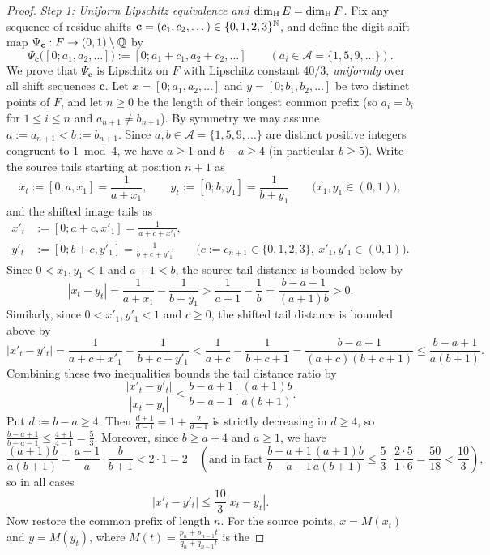 \begin{proof}
\emph{Step 1: Uniform Lipschitz equivalence and $\dim_{\mathrm{H}} E=\dim_{\mathrm{H}} F$.}
Fix any sequence of residue shifts $\mathbf c=(c_1,c_2,\dots)\in\{0,1,2,3\}^{\mathbb{N}}$,
and define the digit-shift map $\Psi_{\mathbf c}:F\to(0,1)\setminus\mathbb{Q}$ by
\[
\Psi_{\mathbf c}\bigl([0;a_1,a_2,\dots]\bigr):=[0;a_1+c_1,a_2+c_2,\dots]
\qquad(a_i\in\mathcal A=\{1,5,9,\dots\}).
\]
We prove that $\Psi_{\mathbf c}$ is Lipschitz on $F$ with Lipschitz constant
$40/3$, \emph{uniformly} over all shift sequences $\mathbf c$. Let
$x=[0;a_1,a_2,\dots]$ and $y=[0;b_1,b_2,\dots]$ be two distinct points of $F$,
and let $n\ge0$ be the length of their longest common prefix (so $a_i=b_i$ for
$1\le i\le n$ and $a_{n+1}\ne b_{n+1}$). By symmetry we may assume
$a:=a_{n+1}<b:=b_{n+1}$. Since $a,b\in\mathcal A=\{1,5,9,\dots\}$ are distinct
positive integers congruent to $1\bmod4$, we have $a\ge1$ and $b-a\ge4$ (in
particular $b\ge5$). Write the source tails starting at position $n+1$ as
\[
x_t:=[0;a,x_1]=\frac{1}{a+x_1},\qquad
y_t:=[0;b,y_1]=\frac{1}{b+y_1}\qquad\bigl(x_1,y_1\in(0,1)\bigr),
\]
and the shifted image tails as
\begin{align*}
x'_t&:=[0;a+c,x'_1]=\frac{1}{a+c+x'_1},\\
y'_t&:=[0;b+c,y'_1]=\frac{1}{b+c+y'_1}\qquad\bigl(c:=c_{n+1}\in\{0,1,2,3\},\ x'_1,y'_1\in(0,1)\bigr).
\end{align*}
Since $0<x_1,y_1<1$ and $a+1<b$, the source tail distance is bounded below by
\[
|x_t-y_t|=\frac{1}{a+x_1}-\frac{1}{b+y_1}
>\frac{1}{a+1}-\frac{1}{b}=\frac{b-a-1}{(a+1)b}>0.
\]
Similarly, since $0<x'_1,y'_1<1$ and $c\ge0$, the shifted tail distance is
bounded above by
\[
|x'_t-y'_t|=\frac{1}{a+c+x'_1}-\frac{1}{b+c+y'_1}
<\frac{1}{a+c}-\frac{1}{b+c+1}=\frac{b-a+1}{(a+c)(b+c+1)}
\le\frac{b-a+1}{a(b+1)}.
\]
Combining these two inequalities bounds the tail distance ratio by
\[
\frac{|x'_t-y'_t|}{|x_t-y_t|}
\le\frac{b-a+1}{b-a-1}\cdot\frac{(a+1)b}{a(b+1)}.
\]
Put $d:=b-a\ge4$. Then $\frac{d+1}{d-1}=1+\frac{2}{d-1}$ is strictly decreasing
in $d\ge4$, so $\frac{b-a+1}{b-a-1}\le\frac{4+1}{4-1}=\frac53$. Moreover,
since $b\ge a+4$ and $a\ge1$, we have
\[
\frac{(a+1)b}{a(b+1)}
=\frac{a+1}{a}\cdot\frac{b}{b+1}
<2\cdot1=2
\quad\left(\text{and in fact }\frac{b-a+1}{b-a-1}\frac{(a+1)b}{a(b+1)}\le\frac53\cdot\frac{2\cdot5}{1\cdot6}=\frac{50}{18}<\frac{10}{3}\right),
\]
so in all cases
\[
|x'_t-y'_t|\le\frac{10}{3}|x_t-y_t|.
\]
Now restore the common prefix of length $n$. For the source points,
$x=M(x_t)$ and $y=M(y_t)$, where $M(t)=\frac{p_n+p_{n-1}t}{q_n+q_{n-1}t}$ is the

\end{proof}
